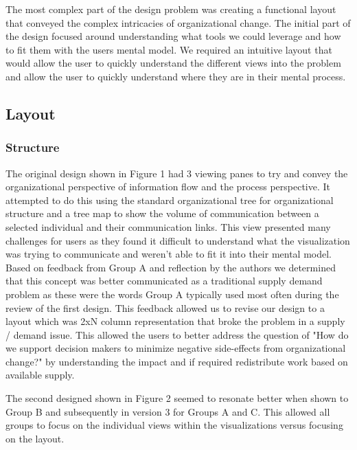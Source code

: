 \message{ !name(FinalPaper.tex)}\documentclass[journal]{vgtc}                %
\begin{document}
The most complex part of the design problem was creating a functional layout that conveyed the complex intricacies of organizational change.  The initial part of the design focused around understanding what tools we could leverage and how to fit them with the users mental model.  We required an intuitive layout that would allow the user to quickly understand the different views into the problem and allow the user to quickly understand where they are in their mental process.

\subsection{Layout}
\subsubsection{Structure}
The original design shown in Figure 1 had 3 viewing panes to try and convey the organizational perspective of information flow and the process perspective.  It attempted to do this using the standard organizational tree for organizational structure and a tree map to show the volume of communication between a selected individual and their communication links.  This view presented many challenges for users as they found it difficult to understand what the visualization was trying to communicate and weren't able to fit it into their mental model.  Based on feedback from Group A and reflection by the authors we determined that this concept was better communicated as a traditional supply demand problem as these were the words Group A typically used most often during the review of the first design.  This feedback allowed us to revise our design to a layout which was 2xN column representation that broke the problem in a supply / demand issue.  This allowed the users to better address the question of "How do we support decision makers to minimize negative side-effects from organizational change?" by understanding the impact and if required redistribute work based on available supply.


The second designed shown in Figure 2 seemed to resonate better when shown to Group B and subsequently in version 3 for Groups A and C.  This allowed all groups to focus on the individual views within the visualizations versus focusing on the layout.
\end{document}
